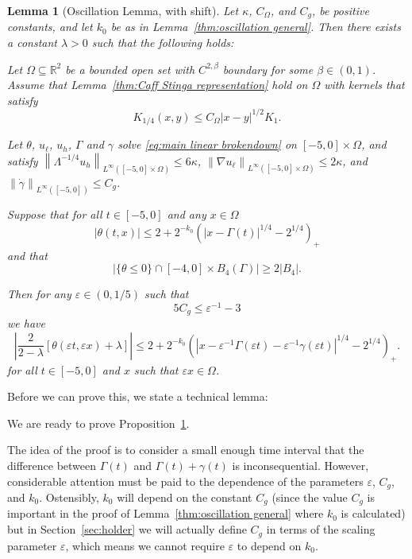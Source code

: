 \documentclass[11pt]{amsart}
\newtheorem{lemma}[theorem]{Lemma}
\theoremstyle{remark}
\theoremstyle{definition}
\newcommand{\R}{\mathbb{R}}
\newcommand{\eps}{\varepsilon}
\newcommand{\norm}[1]{\left\lVert#1\right\rVert}
\newcommand{\paren}[1]{\left( #1 \right)}
\newcommand{\bracket}[1]{\left[ #1 \right]}
\newcommand{\abs}[1]{\left\lvert #1 \right\rvert}
\newcommand{\grad}{\nabla}
\newcommand{\n}{^{-1}}
\newcommand{\ulow}{u_\ell}
\newcommand{\uhigh}{u_h}
\newcommand{\Cgamma}{C_g}
\newcommand{\Comega}{C_\Omega}
\begin{document}
\begin{lemma}[Oscillation Lemma, with shift] \label{thm:oscillation shifted}
Let $\kappa$, $\Comega$, and $\Cgamma$, be positive constants, and let $k_0$ be as in Lemma~\ref{thm:oscillation general}.  Then there exists a constant $\lambda > 0$ such that the following holds:

Let $\Omega \subseteq \R^2$ be a bounded open set with $C^{2,\beta}$ boundary for some $\beta \in (0,1)$.  Assume that Lemma~\ref{thm:Caff Stinga representation} hold on $\Omega$ with kernels that satisfy
\[ K_{1/4}(x,y) \leq \Comega |x-y|^{1/2} K_{1}. \]

Let $\theta$, $\ulow$, $\uhigh$, $\Gamma$ and $\gamma$ solve \eqref{eq:main linear brokendown} on $[-5,0]\times\Omega$, and satisfy $\norm{\Lambda^{-1/4} \uhigh}_{L^\infty([-5,0]\times\Omega)} \leq 6 \kappa$, $\norm{\grad \ulow}_{L^\infty([-5,0]\times\Omega)} \leq 2\kappa$, and $\norm{\dot{\gamma}}_{L^\infty([-5,0])} \leq \Cgamma$.  

Suppose that for all $t \in [-5,0]$ and any $x \in \Omega$
\begin{equation} \label{theta bounded everywhere} |\theta(t,x)| \leq 2 + 2^{-k_0} \paren{|x-\Gamma(t)|^{1/4}-2^{1/4}}_+ \end{equation}
and that
\[ \abs{\{\theta \leq 0\} \cap [-4,0]\times B_4(\Gamma)} \geq 2|B_4|. \]

Then for any $\eps \in (0,1/5)$ such that
\begin{equation} \label{Cgamma and eps for harnack} 5 \Cgamma \leq \eps\n - 3 \end{equation}
we have
\[ \abs{\frac{2}{2-\lambda} \bracket{\theta(\eps t, \eps x) + \lambda}} \leq 2 + 2^{-k_0} \paren{|x-\eps\n\Gamma(\eps t)-\eps\n\gamma(\eps t)|^{1/4}-2^{1/4}}_+. \]
for all $t \in [-5,0]$ and $x$ such that $\eps x \in \Omega$.  
\end{lemma}

Before we can prove this, we state a technical lemma:



We are ready to prove Proposition~\ref{thm:oscillation shifted}.

The idea of the proof is to consider a small enough time interval that the difference between $\Gamma(t)$ and $\Gamma(t) + \gamma(t)$ is inconsequential.  However, considerable attention must be paid to the dependence of the parameters $\eps$, $\Cgamma$, and $k_0$.  Ostensibly, $k_0$ will depend on the constant $\Cgamma$ (since the value $\Cgamma$ is important in the proof of Lemma~\ref{thm:oscillation general} where $k_0$ is calculated) but in Section~\ref{sec:holder} we will actually define $\Cgamma$ in terms of the scaling parameter $\eps$, which means we cannot require $\eps$ to depend on $k_0$.  
\end{document}

